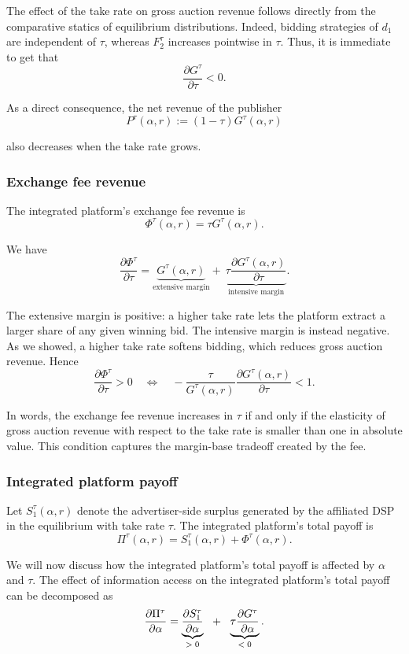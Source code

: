 \noindent The effect of the take rate on gross auction revenue follows directly from the comparative statics of equilibrium distributions. Indeed, bidding strategies of $ d_1 $ are independent of $ \tau $, whereas $ F_2^\tau $ increases pointwise in $ \tau $. Thus, it is immediate to get that
\[
\frac{\partial G^\tau}{\partial \tau} < 0.
\]

\noindent As a direct consequence, the net revenue of the publisher
\[
P^\tau (\alpha, r) := (1 - \tau)G^\tau(\alpha,r)
\]

\noindent also decreases when the take rate grows.

\subsubsection{Exchange fee revenue}

The integrated platform's exchange fee revenue is
\[
\Phi^\tau(\alpha,r)
=
\tau G^\tau(\alpha,r).
\]

\noindent We have
\[
\frac{\partial \Phi^\tau}{\partial \tau}
=
\underbrace{G^\tau(\alpha,r)}_\text{extensive margin}
+ \
\underbrace{\tau\frac{\partial G^\tau(\alpha,r)}{\partial \tau}}_\text{intensive margin}.
\]

\noindent The extensive margin is positive: a higher take rate lets the platform extract a larger share of any given winning bid. The intensive margin is instead negative. As we showed, a higher take rate softens bidding, which reduces gross auction revenue. Hence
\[
\frac{\partial \Phi^\tau}{\partial \tau}>0
\quad\Longleftrightarrow\quad
-\frac{\tau}{G^\tau(\alpha,r)}
\frac{\partial G^\tau(\alpha,r)}{\partial \tau}<1.
\]

\noindent In words, the exchange fee revenue increases in $ \tau $ if and only if the elasticity of gross auction revenue with respect to the take rate is smaller than one in absolute value. This condition captures
the margin-base tradeoff created by the fee.

\subsubsection{Integrated platform payoff}

Let $ S_1^\tau(\alpha,r) $ denote the advertiser-side surplus generated by the affiliated DSP in the equilibrium with take rate $\tau$. The integrated platform's total payoff is
\[
\Pi^\tau(\alpha,r)
=
S_1^\tau(\alpha,r)+\Phi^\tau(\alpha,r).
\]

\noindent We will now discuss how the integrated platform's total payoff is affected by $ \alpha $ and $ \tau $. The effect of information access on the integrated platform's total payoff can be decomposed as
\[
\frac{\partial \Pi^\tau}{\partial \alpha}
=
\underbrace{\frac{\partial S_1^\tau}{\partial \alpha}}_\text{$ > 0 $}
\ \ + \ \
\underbrace{\tau\frac{\partial G^\tau}{\partial \alpha}}_\text{$ < 0 $}.
\]

